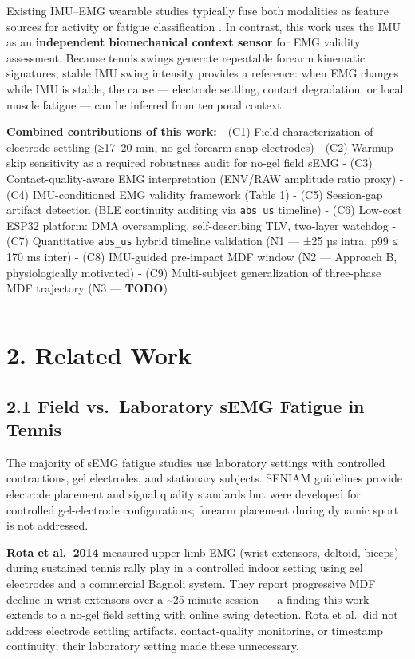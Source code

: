 \documentclass[sensors,article,submit,pdftex,moreauthors]{Definitions/mdpi}
\begin{document}
Existing IMU--EMG wearable studies typically fuse both modalities as feature sources for
activity or fatigue classification \citep{taborri2020, bangaru2022}. In contrast, this work uses the IMU as an
\textbf{independent biomechanical context sensor} for EMG validity assessment. Because tennis
swings generate repeatable forearm kinematic signatures, stable IMU swing intensity provides
a reference: when EMG changes while IMU is stable, the cause --- electrode settling, contact
degradation, or local muscle fatigue --- can be inferred from temporal context.

\textbf{Combined contributions of this work:}
- (C1) Field characterization of electrode settling (≥17--20 min, no-gel forearm snap electrodes)
- (C2) Warmup-skip sensitivity as a required robustness audit for no-gel field sEMG
- (C3) Contact-quality-aware EMG interpretation (ENV/RAW amplitude ratio proxy)
- (C4) IMU-conditioned EMG validity framework (Table 1)
- (C5) Session-gap artifact detection (BLE continuity auditing via \texttt{abs\_us} timeline)
- (C6) Low-cost ESP32 platform: DMA oversampling, self-describing TLV, two-layer watchdog
- (C7) Quantitative \texttt{abs\_us} hybrid timeline validation (N1 --- ±25 µs intra, p99 ≤ 170 ms inter)
- (C8) IMU-guided pre-impact MDF window (N2 --- Approach B, physiologically motivated)
- (C9) Multi-subject generalization of three-phase MDF trajectory (N3 --- \textbf{TODO})

\begin{center}\rule{0.5\linewidth}{0.5pt}\end{center}

\section{2. Related Work}\label{related-work}

\subsection{2.1 Field vs.~Laboratory sEMG Fatigue in Tennis}\label{field-vs.-laboratory-semg-fatigue-in-tennis}

The majority of sEMG fatigue studies use laboratory settings with controlled contractions,
gel electrodes, and stationary subjects. SENIAM guidelines \citep{hermens2000} provide electrode placement
and signal quality standards but were developed for controlled gel-electrode configurations;
forearm placement during dynamic sport is not addressed.

\textbf{Rota et al.~2014} \citep{rota2014} measured upper limb EMG (wrist extensors, deltoid, biceps) during
sustained tennis rally play in a controlled indoor setting using gel electrodes and a
commercial Bagnoli system. They report progressive MDF decline in wrist extensors over a
\textasciitilde25-minute session --- a finding this work extends to a no-gel field setting with online swing
detection. Rota et al.~did not address electrode settling artifacts, contact-quality monitoring,
or timestamp continuity; their laboratory setting made these unnecessary.
\end{document}
